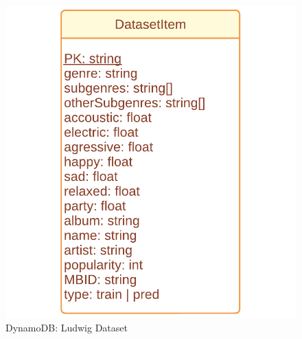 \begin{figure}
    \centering
    \includegraphics{img/C/data_dataset.png}
    \caption{DynamoDB: Ludwig Dataset}
    \label{fig:C:dynamo_dataset}
\end{figure}


